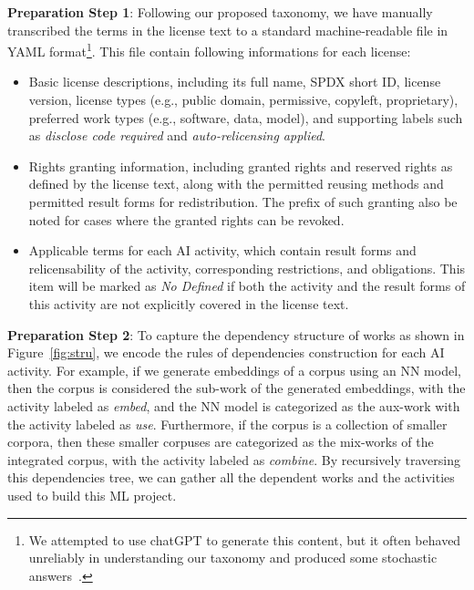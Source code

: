 \textbf{Preparation Step 1}: Following our proposed taxonomy, we have manually transcribed the terms in the license text to a standard machine-readable file in YAML format\footnote{We attempted to use chatGPT to generate this content, but it often behaved unreliably in understanding our taxonomy and produced some stochastic answers~\cite{bender2021dangers}.}.
This file contain following informations for each license:
\begin{itemize}%
    \item Basic license descriptions, including its full name, SPDX short ID, license version, license types (e.g., public domain, permissive, copyleft, proprietary), preferred work types (e.g., software, data, model), and supporting labels such as \textit{disclose code required} and \textit{auto-relicensing applied}.
    
    \item Rights granting information, including granted rights and reserved rights as defined by the license text, along with the permitted reusing methods and permitted result forms for redistribution.
    The prefix of such granting also be noted for cases where the granted rights can be revoked.

    \item Applicable terms for each AI activity, which contain result forms and relicensability of the activity, corresponding restrictions, and obligations. 
    This item will be marked as \textit{No Defined} if both the activity and the result forms of this activity are not explicitly covered in the license text.
\end{itemize}

\textbf{Preparation Step 2}:
To capture the dependency structure of works as shown in Figure~\ref{fig:stru}, we encode the rules of dependencies construction for each AI activity.
For example, if we generate embeddings of a corpus using an NN model, then the corpus is considered the sub-work of the generated embeddings, with the activity labeled as \textit{embed}, and the NN model is categorized as the aux-work with the activity labeled as \textit{use}.
Furthermore, if the corpus is a collection of smaller corpora, then these smaller corpuses are categorized as the mix-works of the integrated corpus, with the activity labeled as \textit{combine}.
By recursively traversing this dependencies tree, we can gather all the dependent works and the activities used to build this ML project.

